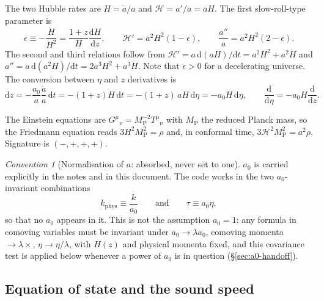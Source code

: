 \documentclass[11pt,a4paper]{article}
\newcommand{\cH}{\mathcal{H}}
\newcommand{\MP}{M_{\mathrm{P}}}
\newcommand{\dd}{\mathrm{d}}
\newcommand{\eps}{\epsilon}
\newcommand{\kphys}{k_{\mathrm{phys}}}
\theoremstyle{remark}
\newtheorem*{convention}{Convention}
\begin{document}
The two Hubble rates are $H = \dot a/a$ and $\cH = a'/a = aH$. The first slow-roll-type parameter is
\begin{equation}
\eps \equiv -\frac{\dot H}{H^2}
= \frac{1+z}{H}\frac{\dd H}{\dd z},
\qquad
\cH' = a^2H^2(1-\eps),
\qquad
\frac{a''}{a} = a^2H^2(2-\eps).
\label{eq:eps-def}
\end{equation}
The second and third relations follow from $\cH' = a\,\dd(aH)/\dd t = a^2H^2 + a^2\dot H$ and $a'' = a\,\dd(a^2H)/\dd t = 2a^3H^2 + a^3\dot H$. Note that $\eps>0$ for a decelerating universe. The conversion between $\eta$ and $z$ derivatives is
\begin{equation}
\dd z = -\frac{a_0}{a}\frac{\dot a}{a}\,\dd t = -(1+z)H\,\dd t = -(1+z)\,aH\,\dd\eta = -a_0H\,\dd\eta,
\qquad
\frac{\dd}{\dd\eta} = -a_0H\frac{\dd}{\dd z}.
\label{eq:deta-dz}
\end{equation}

The Einstein equations are $G^\mu{}_\nu = \MP^{-2}T^\mu{}_\nu$ with $\MP$ the reduced Planck mass, so the Friedmann equation reads $3H^2\MP^2 = \rho$ and, in conformal time, $3\cH^2\MP^2 = a^2\rho$. Signature is $(-,+,+,+)$.

\begin{convention}[Normalisation of $a$: absorbed, never set to one]
$a_0$ is carried explicitly in the notes and in this document. The code works in the two $a_0$-invariant combinations
\begin{equation}
\kphys \equiv \frac{k}{a_0}\qquad\text{and}\qquad \tau \equiv a_0\eta,
\end{equation}
so that no $a_0$ appears in it. This is not the assumption $a_0 = 1$: any formula in comoving variables must be invariant under $a_0\to\lambda a_0$, comoving momenta $\to\lambda\times$, $\eta\to\eta/\lambda$, with $H(z)$ and physical momenta fixed, and this covariance test is applied below whenever a power of $a_0$ is in question (\S\ref{sec:a0-handoff}).
\end{convention}

\subsection{Equation of state and the sound speed}
\label{sec:eos}
\end{document}
